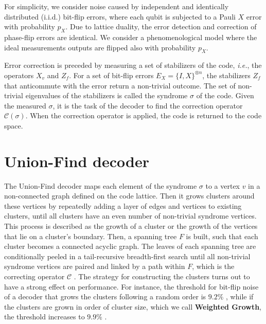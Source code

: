 For simplicity, we consider noise caused by independent and identically distributed (i.i.d.) bit-flip errors, where each qubit is subjected to a Pauli $X$ error with probability $p_X$. Due to {lattice duality}, the error detection and correction of phase-flip errors are identical. We consider a phenomenological model where the ideal measurements outputs are flipped also with probability $p_X$. 

Error correction is preceded by measuring a set of stabilizers of the code, \emph{i.e.}, the operators $X_v$ and $Z_f$. For a set of bit-flip errors $E_X = \{I,X\}^{\otimes n}$, the stabilizers $Z_f$ that anticommute with the error return a non-trivial outcome. The set of non-trivial eigenvalues of the stabilizers is called the syndrome $\sigma$ of the code. Given the measured $\sigma$, it is the task of the decoder to find the correction operator $\mathcal{C}(\sigma)$. When the correction operator is applied, the code is returned to the code space. %

\section{Union-Find decoder}\label{sec:unionfind}
The Union-Find decoder \cite{delfosse2017almost} maps each element of the syndrome $\sigma$ to a vertex $v$ in a non-connected graph defined on the code lattice. Then it grows clusters around these vertices by repeatedly adding a layer of edges and vertices to existing clusters, until all clusters have an even number of non-trivial syndrome vertices. This process is described as the growth of a cluster or the growth of the vertices that lie on a cluster's boundary. Then, a spanning tree $F$ is built, such that each cluster becomes a connected acyclic graph. The leaves of each spanning tree are conditionally peeled in a tail-recursive breadth-first search until all non-trivial syndrome vertices are paired and linked by a path within $F$, which is the correcting operator $\mathcal{C}$ \cite{delfosse2017almost}. The strategy for constructing the clusters turns out to have a strong effect on performance. For instance, the threshold for bit-flip noise of a decoder that grows the clusters following a random order is $9.2\%$ \cite{delfosse2017almost}, while if the clusters are grown in order of cluster size, which we call \textbf{Weighted Growth}, the threshold increases to $9.9\%$ \cite{delfosse2017almost}. %

